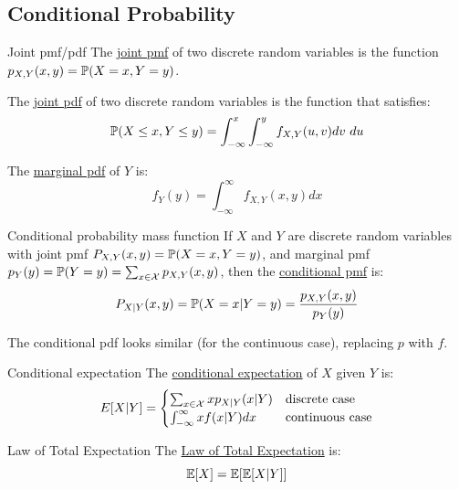 \documentclass[../Main.tex]{subfiles}
\begin{document}
\subsection{Conditional Probability}
\begin{definition}{Joint pmf/pdf}
    The \underline{joint pmf} of two discrete random variables is the function $p_{X, Y}(x, y) = \P(X = x, Y = y)$.

    The \underline{joint pdf} of two discrete random variables is the function that satisfies:
    \begin{equation*}
        \P(X \leq x, Y \leq y) = \int_{-\infty}^{x} \int_{-\infty}^{y} f_{X, Y}(u, v) dv~du 
    \end{equation*}
\end{definition}
The \underline{marginal pdf} of $Y$ is:
\begin{equation*}
    f_Y(y) = \int_{-\infty}^{\infty} f_{X, Y}(x, y) dx 
\end{equation*}
\begin{definition}{Conditional probability mass function}
    If $X$ and $Y$ are discrete random variables with joint pmf $P_{X, Y}(x, y) = \P(X = x, Y = y)$, and marginal pmf $p_Y(y) = \P(Y = y) = \sum_{x \in \samplespace} p_{X, Y}(x, y)$, then the \underline{conditional pmf} is:
    \begin{equation*}
        P_{X | Y}(x, y) = \P(X = x | Y = y) = \frac{p_{X, Y}(x, y)}{p_Y(y)}
    \end{equation*}
\end{definition}
The conditional pdf looks similar (for the continuous case), replacing $p$ with $f$.
\begin{definition}{Conditional expectation}
    The \underline{conditional expectation} of $X$ given $Y$ is:
    \begin{equation*}
        E[X | Y] =
        \begin{cases}
            \sum_{x \in \samplespace} x p_{X | Y}(x | Y) & \text{discrete case} \\
            \int_{-\infty}^{\infty} x f(x | Y) dx & \text{continuous case}
        \end{cases}
    \end{equation*}
\end{definition}
\begin{definition}{Law of Total Expectation}
    The \underline{Law of Total Expectation} is:
    \begin{equation}
        \E[X] = \E[\E[X | Y]]
        \label{eqnTotalExpectation}
    \end{equation}
\end{definition}
\end{document}
